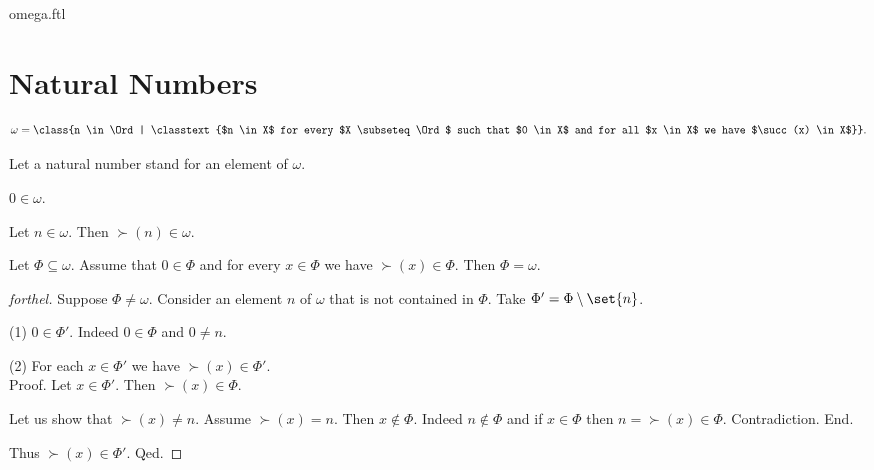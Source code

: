 \documentclass{naproche-library}
\begin{document}
\begin{smodule}{omega.ftl}

  \section*{Natural Numbers}

  \begin{definition}[forthel,id=SET_THEORY_03_4310076227584000]
    \[ \omega = \class{n \in \Ord | \classtext{$n \in X$ for every $X \subseteq \Ord$ such that $0 \in X$ and for all $x \in X$ we have $\succ(x) \in X$}}. \]

  Let a natural number stand for an element of $\omega$.
  \end{definition}

  \begin{proposition}[forthel,id=SET_THEORY_03_3576717620805632]
    $0 \in \omega$.
  \end{proposition}

  \begin{proposition}[forthel,id=SET_THEORY_03_8807317141192704]
    Let $n \in \omega$.
    Then $\succ(n) \in \omega$.
  \end{proposition}

  \begin{proposition}[forthel,id=SET_THEORY_03_344585425387520]
    Let $\Phi \subseteq \omega$.
    Assume that $0 \in \Phi$ and for every $x \in \Phi$ we have
    $\succ(x) \in \Phi$.
    Then $\Phi = \omega$.
  \end{proposition}
  \begin{proof}[forthel]
    Suppose $\Phi \neq \omega$.
    Consider an element $n$ of $\omega$ that is not contained in $\Phi$.
    Take $\Phi' = \Phi \setminus \set{n}$.

    (1) $0 \in \Phi'$.
    Indeed $0 \in \Phi$ and $0 \neq n$.

    (2) For each $x \in \Phi'$ we have $\succ(x) \in \Phi'$. \\
    Proof.
      Let $x \in \Phi'$.
      Then $\succ(x) \in \Phi$.

      Let us show that $\succ(x) \neq n$.
        Assume $\succ(x) = n$.
        Then $x \notin \Phi$.
        Indeed $n \notin \Phi$ and if $x \in \Phi$ then
        $n = \succ(x) \in \Phi$.
        Contradiction.
      End.

      Thus $\succ(x) \in \Phi'$.
    Qed.


\end{proof}
\end{smodule}
\end{document}
